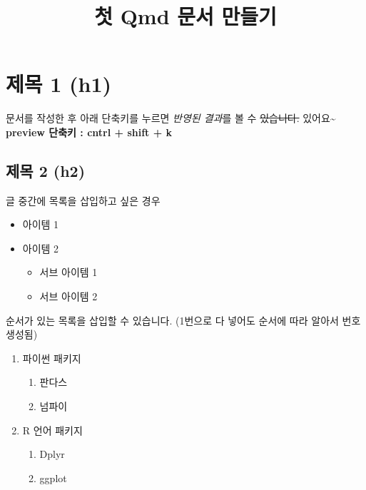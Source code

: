 \documentclass[
  letterpaper,
  DIV=11,
  numbers=noendperiod]{scrartcl}
\title{첫 Qmd 문서 만들기}
\author{}
\date{}
\providecommand{\tightlist}{%
  \setlength{\itemsep}{0pt}\setlength{\parskip}{0pt}}\usepackage{longtable,booktabs,array}
\begin{document}
\maketitle


\section{제목 1 (h1)}\label{uxc81cuxbaa9-1-h1}

문서를 작성한 후 아래 단축키를 누르면 \emph{반영된 결과}를 볼 수
\st{있습니다.} 있어요\textasciitilde{}\\
\textbf{preview 단축키 : cntrl + shift + k}

\subsection{제목 2 (h2)}\label{uxc81cuxbaa9-2-h2}

글 중간에 목록을 삽입하고 싶은 경우

\begin{itemize}
\tightlist
\item
  아이템 1
\item
  아이템 2

  \begin{itemize}
  \tightlist
  \item
    서브 아이템 1
  \item
    서브 아이템 2
  \end{itemize}
\end{itemize}

순서가 있는 목록을 삽입할 수 있습니다. (1번으로 다 넣어도 순서에 따라
알아서 번호 생성됨)

\begin{enumerate}
\def\labelenumi{\arabic{enumi}.}
\tightlist
\item
  파이썬 패키지

  \begin{enumerate}
  \def\labelenumii{\arabic{enumii}.}
  \tightlist
  \item
    판다스
  \item
    넘파이
  \end{enumerate}
\item
  R 언어 패키지

  \begin{enumerate}
  \def\labelenumii{\arabic{enumii}.}
  \tightlist
  \item
    Dplyr
  \item
    ggplot
  \end{enumerate}
\end{enumerate}
\end{document}
